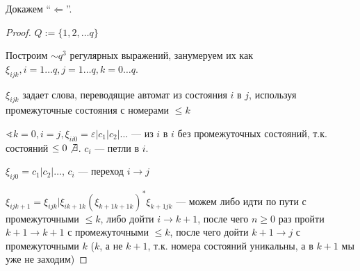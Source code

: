 Докажем ``$\Leftarrow$''.
\begin{proof}
    $Q:=\{1,2,\ldots q\}$

    Построим $\sim q^3$ регулярных выражений, занумеруем их как $\xi_{ijk}, i=1\ldots q, j=1\ldots q, k = 0\ldots q$.

    $\xi_{ijk}$ задает слова, переводящие автомат из состояния $i$ в $j$, используя промежуточные состояния с номерами $\leq k$

    $\sphericalangle k=0, i=j, \xi_{ii0}=\varepsilon|c_1|c_2|\ldots$ --- из $i$ в $i$ без промежуточных состояний, т.к. состояний $\leq 0 \not\exists$. $c_i$ --- петли в $i$.
    
    $\xi_{ij0}=c_1|c_2|\ldots$, $c_i$ --- переход $i\to j$

    $\xi_{ijk+1}=\xi_{ijk}|\xi_{ik+1k}(\xi_{k+1k+1k})^*\xi_{k+1jk}$ --- можем либо идти по пути с промежуточными $\leq k$, либо дойти $i\to k+1$, после чего $n\geq 0$ раз пройти $k+1\to k+1$ с промежуточными $\leq k$, после чего дойти $k+1\to j$  с промежуточными $k$ ($k$, а не $k+1$, т.к. номера состояний уникальны, а в $k+1$ мы уже не заходим)
\end{proof}

